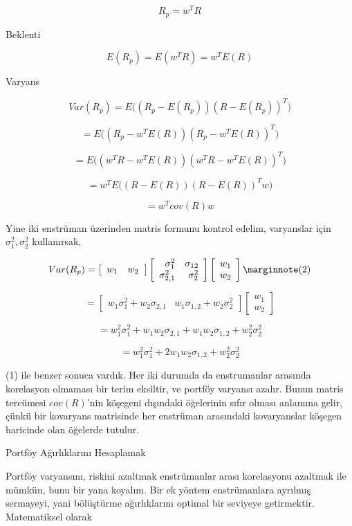 \documentclass[12pt,fleqn]{article}\usepackage{../../common}
\begin{document}
$$ R_p = w^T R $$

Beklenti 

$$ E(R_p) = E(w^T R) = w^TE(R) $$

Varyans

$$ Var(R_p) = E\big( (R_p-E(R_p))(R-E(R_p))^T  \big) $$

$$ = E\big( (R_p-w^TE(R))(R_p-w^TE(R))^T  \big) $$

$$ = E\big( (w^TR-w^TE(R))(w^TR-w^TE(R))^T  \big) $$

$$ = w^T E\big( (R-E(R))(R-E(R))^Tw  \big) $$

$$ = w^T cov (R) w $$

Yine iki enstrüman üzerinden matris formunu kontrol edelim, varyanslar için
$\sigma_1^2,\sigma_2^2$ kullanırsak,

$$ Var(R_p) = 
\left[\begin{array}{cc} w_1 & w_2  \end{array}\right]
\left[\begin{array}{rr}
\sigma_1^2 & \sigma_{12} \\
\sigma_{2,1}^2 & \sigma_2^2 
\end{array}\right]
\left[\begin{array}{r}
w_1 \\ w_2
\end{array}\right] 
\mlabel{2}
$$

$$ = \left[\begin{array}{cc} 
w_1 \sigma_1^2 + w_2 \sigma_{2,1} & 
w_1 \sigma_{1,2} + w_2\sigma_2^2  \end{array}\right]
\left[\begin{array}{r}
w_1 \\ w_2
\end{array}\right] 
$$

$$ = w_1^2\sigma_1^2 + w_1w_2\sigma_{2,1} + w_1w_2\sigma_{1,2} + w_2^2\sigma_2^2$$

$$ = w_1^2\sigma_1^2 + 2 w_1w_2\sigma_{1,2} + w_2^2\sigma_2^2$$

(1) ile benzer sonuca vardık. Her iki durumda da enstrumanlar arasında
korelasyon olmaması bir terim eksiltir, ve portföy varyansı azalır. Bunun matris
tercümesi $cov (R)$'nin köşegeni dışındaki öğelerinin sıfır olması anlamına
gelir, çünkü bir kovaryans matrisinde her enstrüman arasındaki kovaryanslar
köşegen haricinde olan öğelerde tutulur.

Portföy Ağırlıklarını Hesaplamak

Portföy varyansını, riskini azaltmak enstrümanlar arası korelasyonu azaltmak ile
mümkün, bunu bir yana koyalım. Bir ek yöntem enstrümanlara ayrılmış sermayeyi,
yani bölüştürme ağırlıklarını optimal bir seviyeye getirmektir. Matematiksel
olarak
\end{document}
